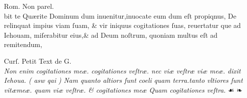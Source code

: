 \documentclass{article}
\begin{document}
{\begin{multicols}{4}
	\columnbreak

	\centering
	\tiny
	Rom. Non parel.\\
	\vspace{\baselineskip}
	\fontsize{3}{3}\selectfont
	\justifying
	\noindent bit te Qu\ae{}rite Dominum dum inuenitur,inuocate eum dum eſt propiqnus,\linebreak%
	De relinquat impius viam ſuam, \& vir iniquus cogitationes ſuas, reuertatur\linebreak%
	que ad Iehouam, miſerabitur eius,\& ad Deum noſtrum, quoniam multus eſt\linebreak%
	ad remitendum,
	\columnbreak

	\centering
	\tiny
	Curſ. Petit Text de G.\\
	\vspace{\baselineskip}
	\fontsize{4}{4.5}\selectfont
	\justifying
	\noindent \textit{Non enim cogitationes me\ae{}. cogitationes veſtr\ae{}. nec vi\ae{} veſtr\ae{} viæ \linebreak
		me\ae{}. dixit Iehoua. ( {\grecs asw qai} ) Nam quanto altiors ſunt coeli quam\linebreak
		terra.tanto vltiores ſunt vit\ae{}me\ae{}. quam vi\ae{} veſtr\ae{}. \& cogitationes\linebreak
		me\ae{} Quam {\normalfont cogitationes} veſtra.} \quad ☙ ❧

	\columnbreak


\end{multicols}}
\end{document}
